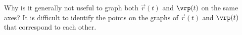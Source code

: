 {Why is it generally not useful to graph both $\vec r(t)$ and $\vrp(t)$ on the same axes?
}
{
It is difficult to identify the points on the graphs of $\vec r(t)$ and $\vrp(t)$ that correspond to each other.
}

